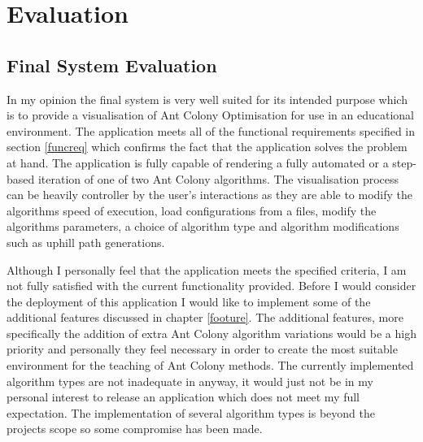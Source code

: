 \chapter{Evaluation}

\section{Final System Evaluation}

In my opinion the final system is very well suited for its intended purpose which is to provide a visualisation of Ant Colony Optimisation for use in an educational environment. The application meets all of the functional requirements specified in section \ref{funcreq} which confirms the fact that the application solves the problem at hand. The application is fully capable of rendering a fully automated or a step-based iteration of one of two Ant Colony algorithms. The visualisation process can be heavily controller by the user’s interactions as they are able to modify the algorithms speed of execution, load configurations from a files, modify the algorithms parameters, a choice of algorithm type and algorithm modifications such as uphill path generations.

Although I personally feel that the application meets the specified criteria, I am not fully satisfied with the current functionality provided. Before I would consider the deployment of this application I would like to implement some of the additional features discussed in chapter \ref{footure}. The additional features, more specifically the addition of extra Ant Colony algorithm variations would be a high priority and personally they feel necessary in order to create the most suitable environment for the teaching of Ant Colony methods. The currently implemented algorithm types are not inadequate in anyway, it would just not be in my personal interest to release an application which does not meet my full expectation. The implementation of several algorithm types is beyond the projects scope so some compromise has been made.

